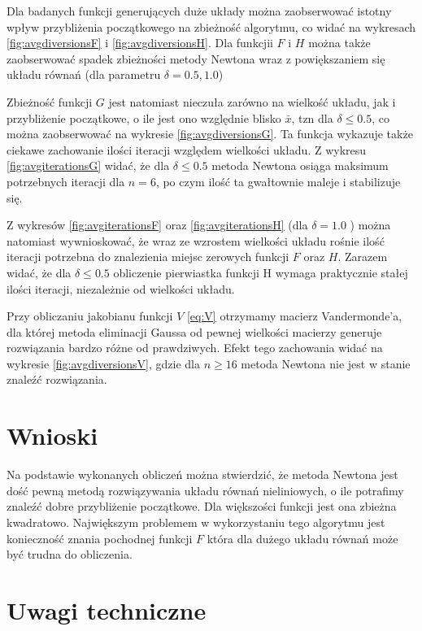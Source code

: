 \documentclass[11pt,wide]{mwart}
\begin{document}
Dla badanych funkcji generujących duże układy można zaobserwować istotny wpływ przybliżenia początkowego na zbieżność algorytmu, co widać na wykresach \ref{fig:avgdiversionsF} i \ref{fig:avgdiversionsH}. Dla funkcjii $ F $ i $ H $ można także zaobserwować spadek zbieżności metody Newtona wraz z powiększaniem się układu równań (dla parametru $ \delta = 0.5, 1.0 $)

Zbieżność funkcji $ G $ jest natomiast nieczuła zarówno na wielkość układu, jak i przybliżenie początkowe, o ile jest ono względnie blisko $ \bar{x} $, tzn dla $ \delta \leq 0.5 $, co można zaobserwować na wykresie \ref{fig:avgdiversionsG}. Ta funkcja wykazuje także ciekawe zachowanie ilości iteracji względem wielkości układu. Z wykresu \ref{fig:avgiterationsG} widać, że dla $ \delta \leq 0.5 $ metoda Newtona osiąga maksimum potrzebnych iteracji dla $ n = 6 $, po czym ilość ta gwałtownie maleje i stabilizuje się.

Z wykresów \ref{fig:avgiterationsF} oraz \ref{fig:avgiterationsH} (dla $ \delta = 1.0 $ )  można natomiast wywnioskować, że wraz ze wzrostem wielkości układu rośnie ilość iteracji potrzebna do znalezienia miejsc zerowych funkcji $ F $ oraz $ H $. Zarazem widać, że dla $ \delta \leq 0.5 $ obliczenie pierwiastka funkcji H wymaga praktycznie stałej ilości iteracji, niezależnie od wielkości układu.

Przy obliczaniu jakobianu funkcji $ V $ \eqref{eq:V} otrzymamy macierz Vandermonde'a, dla której metoda eliminacji Gaussa od pewnej wielkości macierzy generuje rozwiązania bardzo różne od prawdziwych. Efekt tego zachowania widać na wykresie \ref{fig:avgdiversionsV}, gdzie dla $ n \geq 16 $ metoda Newtona nie jest w stanie znaleźć rozwiązania. 

\section{Wnioski}

Na podstawie wykonanych obliczeń można stwierdzić, że metoda Newtona jest dość pewną metodą rozwiązywania układu równań nieliniowych, o ile potrafimy znaleźć dobre przybliżenie początkowe. Dla większości funkcji jest ona zbieżna kwadratowo. Największym problemem w wykorzystaniu tego algorytmu jest konieczność znania pochodnej funkcji $ F $ która dla dużego układu równań może być trudna do obliczenia. 

\section{Uwagi techniczne}
\end{document}

